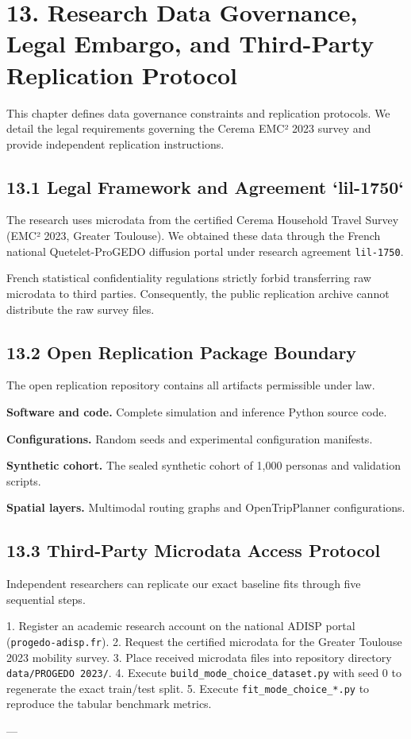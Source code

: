 \section{13. Research Data Governance, Legal Embargo, and Third-Party Replication Protocol}

This chapter defines data governance constraints and replication protocols. We detail the legal requirements governing the Cerema EMC² 2023 survey and provide independent replication instructions.

\subsection{13.1 Legal Framework and Agreement `lil-1750`}

The research uses microdata from the certified Cerema Household Travel Survey (EMC² 2023, Greater Toulouse). We obtained these data through the French national Quetelet-ProGEDO diffusion portal under research agreement \texttt{lil-1750}.

French statistical confidentiality regulations strictly forbid transferring raw microdata to third parties. Consequently, the public replication archive cannot distribute the raw survey files.

\subsection{13.2 Open Replication Package Boundary}

The open replication repository contains all artifacts permissible under law.

\textbf{Software and code.} Complete simulation and inference Python source code.

\textbf{Configurations.} Random seeds and experimental configuration manifests.

\textbf{Synthetic cohort.} The sealed synthetic cohort of 1,000 personas and validation scripts.

\textbf{Spatial layers.} Multimodal routing graphs and OpenTripPlanner configurations.

\subsection{13.3 Third-Party Microdata Access Protocol}

Independent researchers can replicate our exact baseline fits through five sequential steps.

1. Register an academic research account on the national ADISP portal (\texttt{progedo-adisp.fr}).
2. Request the certified microdata for the Greater Toulouse 2023 mobility survey.
3. Place received microdata files into repository directory \texttt{data/PROGEDO 2023/}.
4. Execute \texttt{build_mode_choice_dataset.py} with seed 0 to regenerate the exact train/test split.
5. Execute \texttt{fit_mode_choice_*.py} to reproduce the tabular benchmark metrics.

---
